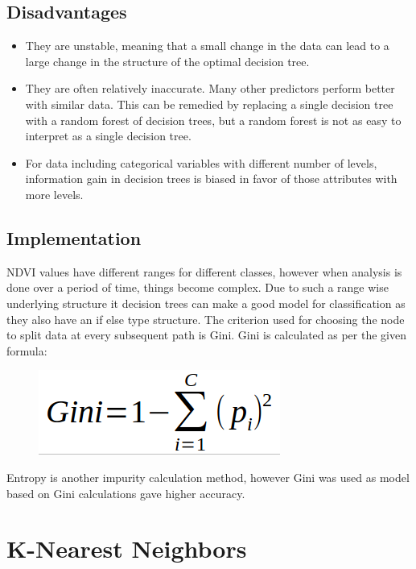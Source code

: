 \documentclass[12pt, a4paper]{report}
\begin{document}
\subsection{Disadvantages}
\begin{itemize}
\item They are unstable, meaning that a small change in the data can lead to a large change in the structure of the optimal decision tree.
\item They are often relatively inaccurate. Many other predictors perform better with similar data. This can be remedied by replacing a single decision tree with a random forest of decision trees, but a random forest is not as easy to interpret as a single decision tree.
\item For data including categorical variables with different number of levels, information gain in decision trees is biased in favor of those attributes with more levels.
\end{itemize}
\subsection{Implementation}
NDVI values have different ranges for different classes, however when analysis is done over a period of time, things become complex. Due to such a range wise  underlying structure it decision trees can make a good model for classification as they also have an if else type structure. The criterion used for choosing the node to split data at every subsequent path is Gini. Gini is calculated as per the given formula:
\begin{figure}[h]
\centering
\includegraphics[width=\textwidth]{giniformula.png}
\end{figure}
Entropy is another impurity calculation method, however Gini was used as model based on Gini calculations gave higher accuracy.
\section{K-Nearest Neighbors}
\end{document}
